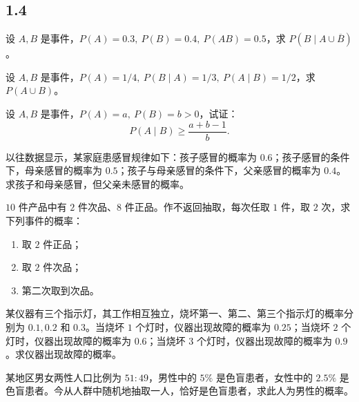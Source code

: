 \subsection*{1.4}
\begin{homework}[1.18]
设 $A,B$ 是事件，$P(A)=0.3,\ P(B)=0.4,\ P(AB)=0.5$，求 $P(B \mid A \cup \overline{B})$。
\end{homework}

\begin{homework}[1.19]
设 $A,B$ 是事件，$P(A)=1/4,\ P(B \mid A)=1/3,\ P(A \mid B)=1/2$，求 $P(A \cup B)$。
\end{homework}

\begin{homework}[1.20]
设 $A,B$ 是事件，$P(A)=a,\ P(B)=b>0$，试证：
\[
P(A \mid B) \ge \frac{a+b-1}{b}.
\]
\end{homework}

\begin{homework}[1.21]
以往数据显示，某家庭患感冒规律如下：孩子感冒的概率为 $0.6$；孩子感冒的条件下，母亲感冒的概率为 $0.5$；孩子与母亲感冒的条件下，父亲感冒的概率为 $0.4$。求孩子和母亲感冒，但父亲未感冒的概率。
\end{homework}

\begin{homework}[1.22]
$10$ 件产品中有 $2$ 件次品、$8$ 件正品。作不返回抽取，每次任取 $1$ 件，取 $2$ 次，求下列事件的概率：

\begin{enumerate}
  \item 取 $2$ 件正品；
  \item 取 $2$ 件次品；
  \item 第二次取到次品。
\end{enumerate}
\end{homework}

\begin{homework}[1.24]
某仪器有三个指示灯，其工作相互独立，烧坏第一、第二、第三个指示灯的概率分别为 $0.1, 0.2$ 和 $0.3$。当烧坏 $1$ 个灯时，仪器出现故障的概率为 $0.25$；当烧坏 $2$ 个灯时，仪器出现故障的概率为 $0.6$；当烧坏 $3$ 个灯时，仪器出现故障的概率为 $0.9$。求仪器出现故障的概率。
\end{homework}

\begin{homework}[1.25]
某地区男女两性人口比例为 $51:49$，男性中的 $5\%$ 是色盲患者，女性中的 $2.5\%$ 是色盲患者。今从人群中随机地抽取一人，恰好是色盲患者，求此人为男性的概率。
\end{homework}

